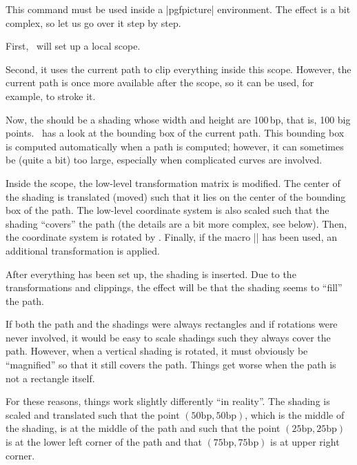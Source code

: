 \begin{command}{\pgfshadepath{}}
    This command must be used inside a |{pgfpicture}| environment. The effect
    is a bit complex, so let us go over it step by step.

    First, \pgfname\ will set up a local scope.

    Second, it uses the current path to clip everything inside this scope.
    However, the current path is once more available after the scope, so it can
    be used, for example, to stroke it.

    Now, the  should be a shading whose width and height are
    100\,bp, that is, 100 big points. \pgfname\ has a look at the bounding box
    of the current path. This bounding box is computed automatically when a
    path is computed; however, it can sometimes be (quite a bit) too large,
    especially when complicated curves are involved.

    Inside the scope, the low-level transformation matrix is modified. The
    center of the shading is translated (moved) such that it lies on the center
    of the bounding box of the path. The low-level coordinate system is also
    scaled such that the shading ``covers'' the path (the details are a bit
    more complex, see below). Then, the coordinate system is rotated by
    . Finally, if the macro |\pgfsetadditionalshadetransform| has
    been used, an additional transformation is applied.

    After everything has been set up, the shading is inserted. Due to the
    transformations and clippings, the effect will be that  the shading seems
    to ``fill'' the path.

    If both the path and the shadings were always rectangles and if rotations
    were never involved, it would be easy to scale shadings such they always
    cover the path. However, when a vertical shading is rotated, it must
    obviously be ``magnified'' so that it still covers the path. Things get
    worse when the path is not a rectangle itself.

    For these reasons, things work slightly differently ``in reality''. The
    shading is scaled and translated such that the point
    $(50\mathrm{bp},50\mathrm{bp})$, which is the middle of the shading, is at
    the middle of the path and such that the point
    $(25\mathrm{bp},25\mathrm{bp})$ is at the lower left corner of the path and
    that  $(75\mathrm{bp},75\mathrm{bp})$  is at upper right corner.


\end{command}
